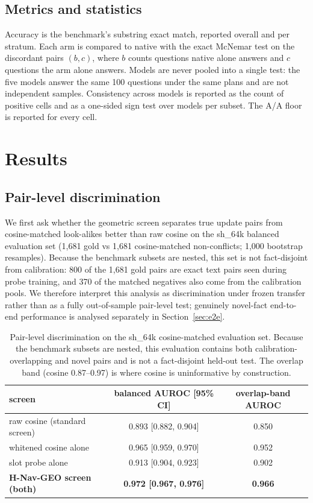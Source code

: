 \documentclass[journal=jcisd8,manuscript=article]{achemso}
\begin{document}
\subsection{Metrics and statistics}

Accuracy is the benchmark's substring exact match, reported overall and per stratum. Each arm is compared to native with the exact McNemar test on the discordant pairs $(b,c)$, where $b$ counts questions native alone answers and $c$ questions the arm alone answers. Models are never pooled into a single test: the five models answer the same 100 questions under the same plans and are not independent samples. Consistency across models is reported as the count of positive cells and as a one-sided sign test over models per subset. The A/A floor is reported for every cell.

\section{Results}
\label{sec:results}

\subsection{Pair-level discrimination}

We first ask whether the geometric screen separates true update pairs from cosine-matched look-alikes better than raw cosine on the sh\_64k balanced evaluation set (1,681 gold vs 1,681 cosine-matched non-conflicts; 1,000 bootstrap resamples). Because the benchmark subsets are nested, this set is not fact-disjoint from calibration: 800 of the 1,681 gold pairs are exact text pairs seen during probe training, and 370 of the matched negatives also come from the calibration pools. We therefore interpret this analysis as discrimination under frozen transfer rather than as a fully out-of-sample pair-level test; genuinely novel-fact end-to-end performance is analysed separately in Section~\ref{sec:e2e}.

\begin{table}[H]\centering
\caption{Pair-level discrimination on the sh\_64k cosine-matched evaluation set. Because the benchmark subsets are nested, this evaluation contains both calibration-overlapping and novel pairs and is not a fact-disjoint held-out test. The overlap band (cosine 0.87--0.97) is where cosine is uninformative by construction.}
\begin{tabular}{lcc}\toprule
screen & balanced AUROC [95\% CI] & overlap-band AUROC\\\midrule
raw cosine (standard screen) & 0.893 [0.882, 0.904] & 0.850\\
whitened cosine alone & 0.965 [0.959, 0.970] & 0.952\\
slot probe alone & 0.913 [0.904, 0.923] & 0.902\\
\textbf{H-Nav-GEO screen (both)} & \textbf{0.972 [0.967, 0.976]} & \textbf{0.966}\\\bottomrule
\end{tabular}\label{tab:pairlevel}\end{table}
\end{document}
